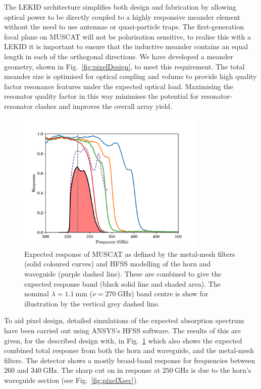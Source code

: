 \documentclass{spie}
\begin{document}
\par 
The LEKID architecture simplifies both design and fabrication by allowing optical power to be directly coupled to a highly responsive meander element without the need to use antennae or quasi-particle traps.\cite{Doyle2010} The first-generation focal plane on MUSCAT will not be polarisation sensitive, to realise this with a LEKID it is important to ensure that the inductive meander contains an equal length in each of the orthogonal directions. We have developed a meander geometry, shown in Fig.~\ref{fig:pixelDesign}, to meet this requirement. The total meander size is optimised for optical coupling and volume to provide high quality factor resonance features under the expected optical load. Maximising the resonator quality factor in this way minimises the potential for resonator-resonator clashes and improves the overall array yield. 
\par
\begin{figure}[tb]
\centering
\includegraphics[width=0.8\textwidth]{MUSCATband}
\caption{Expected response of MUSCAT as defined by the metal-mesh filters (solid coloured curves) and HFSS modelling of the horn and waveguide (purple dashed line). These are combined to give the expected response band (black solid line and shaded area). The nominal $\lambda=1.1~\si{\milli\metre}$ ($\nu = 270~\si{\giga\hertz}$) band centre is show for illustration by the vertical grey dashed line.}\label{fig:MUSCATband}
\end{figure} 
To aid pixel design, detailed simulations of the expected absorption spectrum have been carried out using ANSYS's HFSS software. The results of this are given, for the described design with, in Fig.~\ref{fig:MUSCATband} which also shows the expected combined total response from both the horn and waveguide, and the metal-mesh filters. The detector shows a mostly broad-band response for frequencies between $260$ and $340~\si{\giga\hertz}$. The sharp cut on in response at $250~\si{\giga\hertz}$ is due to the horn's waveguide section (see Fig.~\ref{fig:pixelXsec}). 
%
\end{document}
